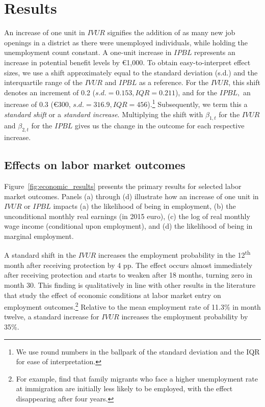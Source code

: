 
\section{Results} \label{sec:results}

An increase of one unit in $IVUR$ signifies the addition of as many new job openings in a district as there were unemployed individuals, while holding the unemployment count constant. A one-unit increase in $IPBL$ represents an increase in potential benefit levels by €1,000. To obtain easy-to-interpret effect sizes, we use a shift approximately equal to the standard deviation (s.d.) and the interquartile range of the $IVUR$ and $IPBL$ as a reference. For the $IVUR$, this shift denotes an increment of 0.2 ($s.d.=0.153, IQR=0.211$), and for the $IPBL,$  an increase of 0.3 (€300, $s.d.=316.9, IQR=456$).\footnote{We use round numbers in the ballpark of the standard deviation and the IQR for ease of interpretation.} Subsequently, we term this a \textit{standard shift} or a \textit{standard increase}.
Multiplying the shift with $\beta_{1,t}$ for the $IVUR$ and $\beta_{2,t}$ for the $IPBL$ gives us the change in the outcome for each respective increase.

\subsection{Effects on labor market outcomes}

Figure~\ref{fig:economic_results} presents the primary results for selected labor market outcomes. Panels (a) through (d) illustrate how an increase of one unit in $IVUR$ or $IPBL$ impacts (a) the likelihood of being in employment, (b) the unconditional monthly real earnings (in 2015 euro), (c) the log of real monthly wage income (conditional upon employment), and (d) the likelihood of being in marginal employment.

A standard shift in the $IVUR$ increases the employment probability in the 12\textsuperscript{th} month after receiving protection by 4 pp. The effect occurs almost immediately after receiving protection and starts to weaken after 18 months, turning zero in month 30. This finding is qualitatively in line with other results in the literature that study the effect of economic conditions at labor market entry on employment outcomes.\footnote{For example, \citet{barsbai2024} find that family migrants who face a higher unemployment rate at immigration are initially less likely to be employed, with the effect disappearing after four years.} Relative to the mean employment rate of 11.3\% in month twelve, a standard increase for $IVUR$ increases the employment probability by 35\%.


